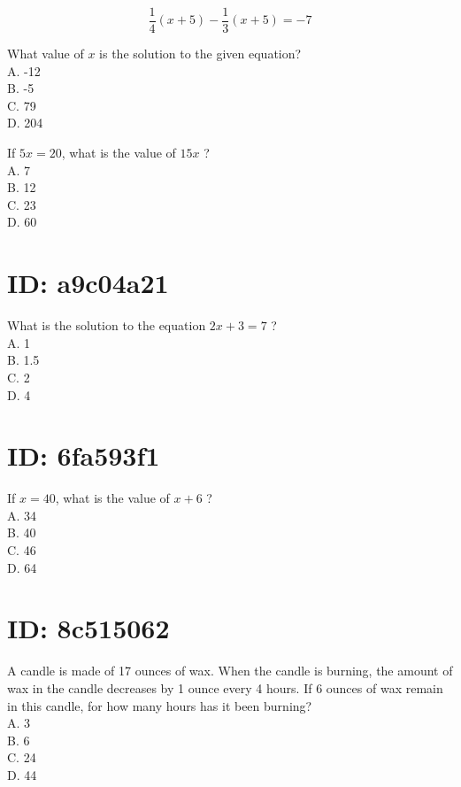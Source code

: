 $$
\frac{1}{4}(x+5)-\frac{1}{3}(x+5)=-7
$$

What value of $x$ is the solution to the given equation?\\
A. -12\\
B. -5\\
C. 79\\
D. 204

If $5 x=20$, what is the value of $15 x$ ?\\
A. 7\\
B. 12\\
C. 23\\
D. 60

\section*{ID: a9c04a21}
What is the solution to the equation $2 x+3=7$ ?\\
A. 1\\
B. 1.5\\
C. 2\\
D. 4

\section*{ID: 6fa593f1}
If $x=40$, what is the value of $x+6$ ?\\
A. 34\\
B. 40\\
C. 46\\
D. 64

\section*{ID: 8c515062}
A candle is made of 17 ounces of wax. When the candle is burning, the amount of wax in the candle decreases by 1 ounce every 4 hours. If 6 ounces of wax remain in this candle, for how many hours has it been burning?\\
A. 3\\
B. 6\\
C. 24\\
D. 44



